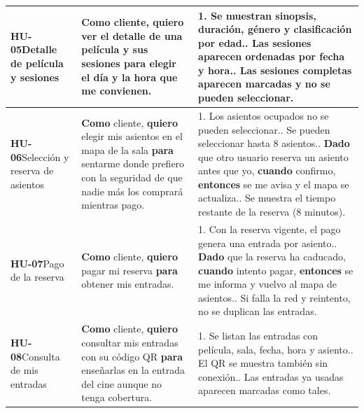 \documentclass[11pt,a4paper]{article}
\begin{document}
\begin{longtable}{L{2.8cm} L{5.8cm} L{6.1cm}}
\midrule
\textbf{HU-05}\newline Detalle de película y sesiones & \textbf{Como} cliente, \textbf{quiero} ver el detalle de una película y sus sesiones \textbf{para} elegir el día y la hora que me convienen. & 1. Se muestran sinopsis, duración, género y clasificación por edad.. Las sesiones aparecen ordenadas por fecha y hora.. Las sesiones completas aparecen marcadas y no se pueden seleccionar. \\
\midrule
\textbf{HU-06}\newline Selección y reserva de asientos & \textbf{Como} cliente, \textbf{quiero} elegir mis asientos en el mapa de la sala \textbf{para} sentarme donde prefiero con la seguridad de que nadie más los comprará mientras pago. & 1. Los asientos ocupados no se pueden seleccionar.. Se pueden seleccionar hasta 8 asientos.. \textbf{Dado} que otro usuario reserva un asiento antes que yo, \textbf{cuando} confirmo, \textbf{entonces} se me avisa y el mapa se actualiza.. Se muestra el tiempo restante de la reserva (8 minutos). \\
\midrule
\textbf{HU-07}\newline Pago de la reserva & \textbf{Como} cliente, \textbf{quiero} pagar mi reserva \textbf{para} obtener mis entradas. & 1. Con la reserva vigente, el pago genera una entrada por asiento.. \textbf{Dado} que la reserva ha caducado, \textbf{cuando} intento pagar, \textbf{entonces} se me informa y vuelvo al mapa de asientos.. Si falla la red y reintento, no se duplican las entradas. \\
\midrule
\textbf{HU-08}\newline Consulta de mis entradas & \textbf{Como} cliente, \textbf{quiero} consultar mis entradas con su código QR \textbf{para} enseñarlas en la entrada del cine aunque no tenga cobertura. & 1. Se listan las entradas con película, sala, fecha, hora y asiento.. El QR se muestra también sin conexión.. Las entradas ya usadas aparecen marcadas como tales. \\

\end{longtable}
\end{document}
